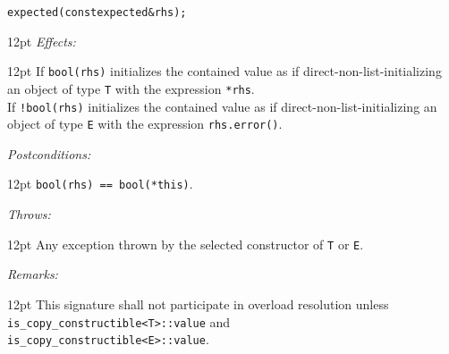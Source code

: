 \documentclass[a4paper,10pt]{article}
\newcommand{\cpp}[1]{\lstinline{#1}}
\newcommand{\wordingItem}[1]{\noindent\textit{#1:}}
\newenvironment{wordingTextItem}[1]{\wordingItem{#1}\vspace{2pt}\noindent\begin{adjustwidth}{12pt}{}}{\vspace{2pt}\end{adjustwidth}}
\newenvironment{wordingPara}{\begin{adjustwidth}{12pt}{}}{\end{adjustwidth}}
\begin{document}
\begin{alltt}
expected(const expected& rhs);
\end{alltt}
\begin{wordingPara}
\begin{wordingTextItem}{Effects}
If \cpp{bool(rhs)} initializes the contained value as if direct-non-list-initializing an object of type \cpp{T} with the expression \cpp{*rhs}.\\

\noindent
If \cpp{!bool(rhs)} initializes the contained value as if direct-non-list-initializing an object of type \cpp{E} with the expression \cpp{rhs.error()}.
\end{wordingTextItem}
\begin{wordingTextItem}{Postconditions}
\cpp{bool(rhs) == bool(*this)}.
\end{wordingTextItem}
\begin{wordingTextItem}{Throws}
Any exception thrown by the selected constructor of \cpp{T} or \cpp{E}.
\end{wordingTextItem}
\begin{wordingTextItem}{Remarks}
This signature shall not participate in overload resolution unless\\
\cpp{is_copy_constructible<T>::value} and\\
\cpp{is_copy_constructible<E>::value}.
\end{wordingTextItem}
\end{wordingPara}
\end{document}
